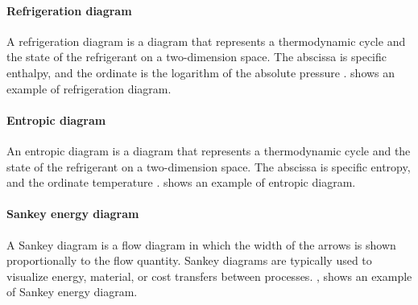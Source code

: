 \paragraph{Refrigeration diagram}

A refrigeration diagram is a diagram that represents a thermodynamic
cycle and the state of the refrigerant on a two-dimension space. The
abscissa is specific enthalpy, and the ordinate is the logarithm of
the absolute pressure
\citep[p.\,370--373]{Borel-Favrat-2010a}. 
shows an example of refrigeration diagram.

\paragraph{Entropic diagram}

An entropic diagram is a diagram that represents a thermodynamic cycle
and the state of the refrigerant on a two-dimension space. The
abscissa is specific entropy, and the ordinate temperature
\citep[p.\,355--361]{Borel-Favrat-2010a}. 
shows an example of entropic diagram.

\paragraph{Sankey energy diagram}

A Sankey diagram is a flow diagram in which the width of the arrows is
shown proportionally to the flow quantity. Sankey diagrams are
typically used to visualize energy, material, or cost transfers
between processes. , shows an
example of Sankey energy diagram.

\FloatBarrier


\label{sec:methodo-refs}
